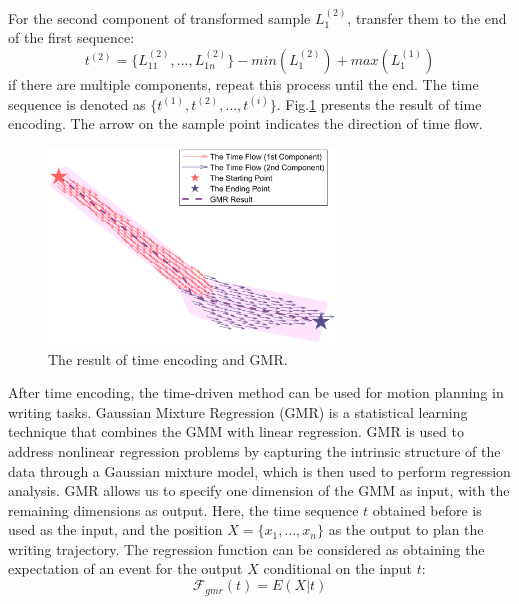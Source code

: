 \documentclass[conference]{IEEEtran}
\begin{document}
For the second component of transformed sample $L_{1}^{(2)}$, transfer them to the end of the first sequence:
\begin{equation}
    t^{(2)}=\{L_{11}^{(2)}, \hdots, L_{1n}^{(2)}\}-min(L_{1}^{(2)})+max(L_{1}^{(1)})
\end{equation}
if there are multiple components, repeat this process until the end. The time sequence is denoted as $\{t^{(1)},t^{(2)},\hdots,t^{(i)}\}$. Fig.\ref{fig4} presents the result of time encoding. The arrow on the sample point indicates the direction of time flow.
\begin{figure}[!t]
    \centering
    \includegraphics[width=3in]{./fig/fig4.pdf}
    \caption{The result of time encoding and GMR.}
    \label{fig4}
\end{figure}

After time encoding, the time-driven method can be used for motion planning in writing tasks. Gaussian Mixture Regression (GMR) is a statistical learning technique that combines the GMM with linear regression. GMR is used to address nonlinear regression problems by capturing the intrinsic structure of the data through a Gaussian mixture model, which is then used to perform regression analysis. GMR allows us to specify one dimension of the GMM as input, with the remaining dimensions as output. Here, the time sequence $t$ obtained before is used as the input, and the position $X=\{x_1,\hdots,x_n\}$ as the output to plan the writing trajectory. The regression function can be considered as obtaining the expectation of an event for the output $X$ conditional on the input $t$:
\begin{equation}
    \mathcal{F} _{gmr}(t)=E(X|t)
\end{equation}
\end{document}
